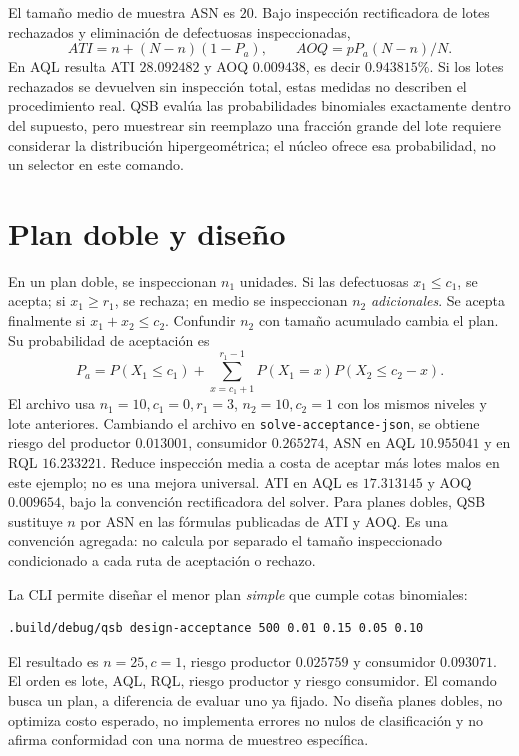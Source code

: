 El tamaño medio de muestra ASN es \(20\). Bajo inspección rectificadora de
lotes rechazados y eliminación de defectuosas inspeccionadas,
\[
 ATI=n+(N-n)(1-P_a),\qquad AOQ=pP_a(N-n)/N.
\]
En AQL resulta ATI \(28.092482\) y AOQ \(0.009438\), es decir
\(0.943815\%\). Si los lotes rechazados se devuelven sin inspección total,
estas medidas no describen el procedimiento real. QSB evalúa las probabilidades
binomiales exactamente dentro del supuesto, pero muestrear sin reemplazo una
fracción grande del lote requiere considerar la distribución hipergeométrica;
el núcleo ofrece esa probabilidad, no un selector en este comando.

\section{Plan doble y diseño}
En un plan doble, se inspeccionan \(n_1\) unidades. Si las defectuosas
\(x_1\le c_1\), se acepta; si \(x_1\ge r_1\), se rechaza; en medio se
inspeccionan \(n_2\) \emph{adicionales}. Se acepta finalmente si
\(x_1+x_2\le c_2\). Confundir \(n_2\) con tamaño acumulado cambia el plan.
Su probabilidad de aceptación es
\[
 P_a=P(X_1\le c_1)+
 \sum_{x=c_1+1}^{r_1-1}P(X_1=x)P(X_2\le c_2-x).
\]
El archivo  usa \(n_1=10,c_1=0,r_1=3\),
\(n_2=10,c_2=1\) con los mismos niveles y lote anteriores. Cambiando el
archivo en \texttt{solve-acceptance-json}, se obtiene riesgo del productor
\(0.013001\), consumidor \(0.265274\), ASN en AQL \(10.955041\) y en RQL
\(16.233221\). Reduce inspección media a costa de aceptar más lotes malos en
este ejemplo; no es una mejora universal. ATI en AQL es \(17.313145\) y
AOQ \(0.009654\), bajo la convención rectificadora del solver.
Para planes dobles, QSB sustituye \(n\) por ASN en las fórmulas publicadas
de ATI y AOQ. Es una convención agregada: no calcula por separado el tamaño
inspeccionado condicionado a cada ruta de aceptación o rechazo.

La CLI permite diseñar el menor plan \emph{simple} que cumple cotas binomiales:
\begin{lstlisting}
.build/debug/qsb design-acceptance 500 0.01 0.15 0.05 0.10
\end{lstlisting}
El resultado es \(n=25,c=1\), riesgo productor \(0.025759\) y consumidor
\(0.093071\). El orden es lote, AQL, RQL, riesgo productor y riesgo consumidor. El comando
busca un plan, a diferencia de evaluar uno ya fijado. No diseña planes dobles,
no optimiza costo esperado, no implementa errores no nulos de clasificación
y no afirma conformidad con una norma de muestreo específica.


